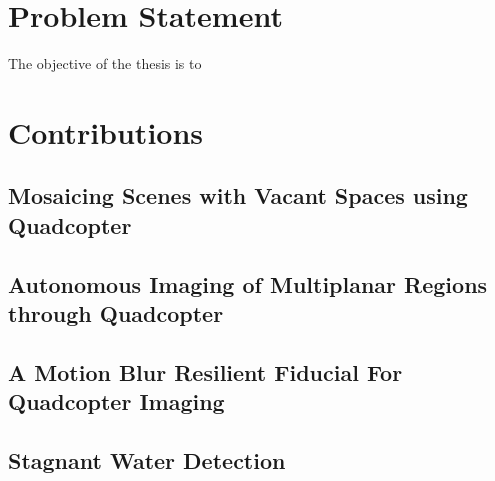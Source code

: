 \section{Problem Statement}
The objective of the thesis is to 
\section{Contributions}
\subsection{Mosaicing Scenes with Vacant Spaces using Quadcopter}
\subsection{Autonomous Imaging of Multiplanar Regions through Quadcopter}
\subsection{A Motion Blur Resilient Fiducial For Quadcopter Imaging}
\subsection{Stagnant Water Detection}
